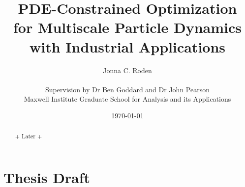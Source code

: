 \documentclass[11pt, a4paper]{article}
\title{{\huge PDE-Constrained Optimization \\for Multiscale Particle Dynamics} \\ with Industrial Applications}
\author{Jonna C. Roden\\ \\Supervision by Dr Ben Goddard and Dr John Pearson\\ \vspace{0.5cm} Maxwell Institute Graduate School for Analysis and its Applications}
\date{\today}
\theoremstyle{definition}
\begin{document}
	\maketitle
\begin{abstract}
+ Later +
	
\end{abstract}

\newpage
{} 
\tableofcontents
\newpage
{} 

\section*{Thesis Draft}	
	
\end{document}
